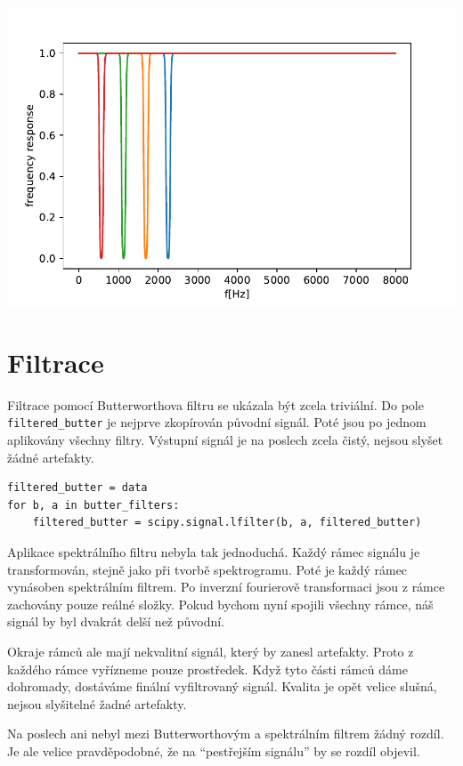 \documentclass[12pt,a4paper]{article}
\begin{document}
		\includegraphics{img/filter_butter.pdf}
		
		\newpage
	
	
	\section{Filtrace}
	
		Filtrace pomocí Butterworthova filtru se ukázala být zcela triviální. 
		Do pole \texttt{filtered\_butter} je nejprve zkopírován původní signál.
		Poté jsou po jednom aplikovány všechny filtry. Výstupní signál je na poslech zcela čistý, nejsou slyšet žádné artefakty.
		
		\begin{verbatim}
filtered_butter = data
for b, a in butter_filters:
    filtered_butter = scipy.signal.lfilter(b, a, filtered_butter)
		\end{verbatim}
		
		Aplikace spektrálního filtru nebyla tak jednoduchá. 
		Každý rámec signálu je transformován, stejně jako při tvorbě spektrogramu.
		Poté je každý rámec vynásoben spektrálním filtrem. 
		Po inverzní fourierově transformaci jsou z rámce zachovány pouze reálné složky. Pokud bychom nyní spojili všechny rámce, náš signál by byl dvakrát delší než původní. 
		
		Okraje rámců ale mají nekvalitní signál, který by zanesl artefakty. Proto z každého rámce vyřízneme pouze prostředek. Když tyto části rámců dáme dohromady, dostáváme finální vyfiltrovaný signál. Kvalita je opět velice slušná, nejsou slyšitelné žadné artefakty.
		
		Na poslech ani nebyl mezi Butterworthovým a spektrálním filtrem žádný rozdíl. 
		Je ale velice pravděpodobné, že na \enquote{pestřejším signálu} by se rozdíl objevil.
		
\end{document}
